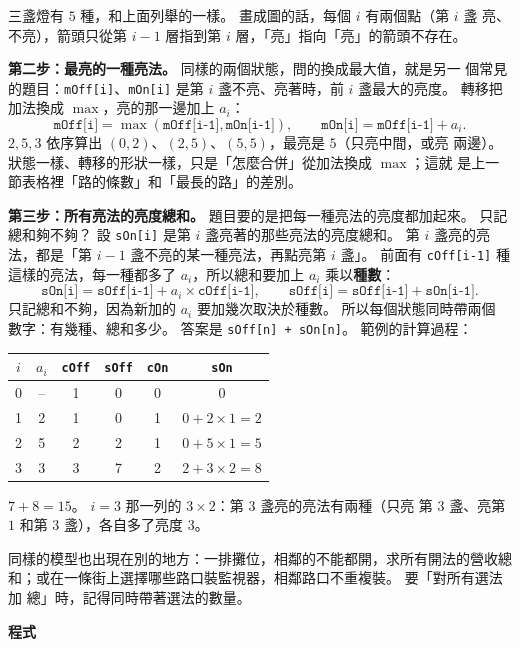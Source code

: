 三盞燈有 $5$ 種，和上面列舉的一樣。 畫成圖的話，每個 $i$ 有兩個點（第 $i$ 盞
亮、不亮），箭頭只從第 $i - 1$ 層指到第 $i$ 層，「亮」指向「亮」的箭頭不存在。

\textbf{第二步：最亮的一種亮法。} 同樣的兩個狀態，問的換成最大值，就是另一
個常見的題目：\texttt{mOff[i]}、\texttt{mOn[i]} 是第 $i$ 盞不亮、亮著時，前
$i$ 盞最大的亮度。 轉移把加法換成 $\max$，亮的那一邊加上 $a_i$：
\[
\texttt{mOff[i]} = \max(\texttt{mOff[i-1]}, \texttt{mOn[i-1]}),\qquad
\texttt{mOn[i]} = \texttt{mOff[i-1]} + a_i.
\]
$2, 5, 3$ 依序算出 $(0, 2)$、$(2, 5)$、$(5, 5)$，最亮是 $5$（只亮中間，或亮
兩邊）。 狀態一樣、轉移的形狀一樣，只是「怎麼合併」從加法換成 $\max$；這就
是上一節表格裡「路的條數」和「最長的路」的差別。

\textbf{第三步：所有亮法的亮度總和。} 題目要的是把每一種亮法的亮度都加起來。
只記總和夠不夠？ 設 \texttt{sOn[i]} 是第 $i$ 盞亮著的那些亮法的亮度總和。
第 $i$ 盞亮的亮法，都是「第 $i - 1$ 盞不亮的某一種亮法，再點亮第 $i$ 盞」。
前面有 \texttt{cOff[i-1]} 種這樣的亮法，每一種都多了 $a_i$，所以總和要加上
$a_i$ 乘以\textbf{種數}：
\[
\texttt{sOn[i]} = \texttt{sOff[i-1]} + a_i \times \texttt{cOff[i-1]},\qquad
\texttt{sOff[i]} = \texttt{sOff[i-1]} + \texttt{sOn[i-1]}.
\]
只記總和不夠，因為新加的 $a_i$ 要加幾次取決於種數。 所以每個狀態同時帶兩個
數字：有幾種、總和多少。 答案是 \texttt{sOff[n] + sOn[n]}。 範例的計算過程：

\begin{center}
\begin{tabular}{cc|cccc}
\toprule
$i$ & $a_i$ & \texttt{cOff} & \texttt{sOff} & \texttt{cOn} & \texttt{sOn} \\
\midrule
0 & -- & 1 & 0 & 0 & 0 \\
1 & 2 & 1 & 0 & 1 & $0 + 2 \times 1 = 2$ \\
2 & 5 & 2 & 2 & 1 & $0 + 5 \times 1 = 5$ \\
3 & 3 & 3 & 7 & 2 & $2 + 3 \times 2 = 8$ \\
\bottomrule
\end{tabular}
\end{center}

$7 + 8 = 15$。 $i = 3$ 那一列的 $3 \times 2$：第 $3$ 盞亮的亮法有兩種（只亮
第 $3$ 盞、亮第 $1$ 和第 $3$ 盞），各自多了亮度 $3$。

同樣的模型也出現在別的地方：一排攤位，相鄰的不能都開，求所有開法的營收總
和；或在一條街上選擇哪些路口裝監視器，相鄰路口不重複裝。 要「對所有選法加
總」時，記得同時帶著選法的數量。

\textbf{程式}

